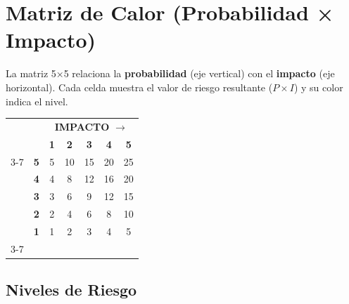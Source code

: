 \documentclass[11pt,a4paper]{article}
\begin{document}
\section{Matriz de Calor (Probabilidad × Impacto)}

La matriz 5×5 relaciona la \textbf{probabilidad} (eje vertical) con el \textbf{impacto} (eje horizontal). Cada celda muestra el valor de riesgo resultante (\(P \times I\)) y su color indica el nivel.

\begin{center}
\renewcommand{\arraystretch}{1.9}
\setlength{\tabcolsep}{8pt}
\begin{tabular}{@{} c c | c c c c c @{}}
\multicolumn{2}{c}{} & \multicolumn{5}{c}{\textbf{IMPACTO} $\longrightarrow$} \\
\multicolumn{2}{c}{} & \textbf{1} & \textbf{2} & \textbf{3} & \textbf{4} & \textbf{5} \\
\cline{3-7}
\multirow{5}{*}{\rotatebox[origin=c]{90}{\textbf{PROBABILIDAD} $\longrightarrow$}}
 & \textbf{5} & \cellcolor{nivelmedio}5 & \cellcolor{nivelalto}10 & \cellcolor{nivelalto}15 & \cellcolor{nivelcritico}20 & \cellcolor{nivelcritico}25 \\
 & \textbf{4} & \cellcolor{nivelbajo}4 & \cellcolor{nivelmedio}8 & \cellcolor{nivelalto}12 & \cellcolor{nivelcritico}16 & \cellcolor{nivelcritico}20 \\
 & \textbf{3} & \cellcolor{nivelbajo}3 & \cellcolor{nivelmedio}6 & \cellcolor{nivelmedio}9 & \cellcolor{nivelalto}12 & \cellcolor{nivelalto}15 \\
 & \textbf{2} & \cellcolor{nivelbajo}2 & \cellcolor{nivelbajo}4 & \cellcolor{nivelmedio}6 & \cellcolor{nivelmedio}8 & \cellcolor{nivelalto}10 \\
 & \textbf{1} & \cellcolor{nivelbajo}1 & \cellcolor{nivelbajo}2 & \cellcolor{nivelbajo}3 & \cellcolor{nivelbajo}4 & \cellcolor{nivelmedio}5 \\
\cline{3-7}
\end{tabular}
\end{center}

\subsection{Niveles de Riesgo}\label{sec:niveles}
\end{document}
